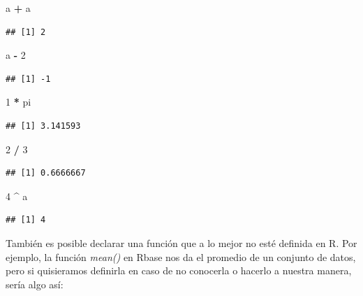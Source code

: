 \documentclass[
]{book}
\newenvironment{Shaded}{\begin{snugshade}}{\end{snugshade}}
\newcommand{\DecValTok}[1]{\textcolor[rgb]{0.00,0.00,0.81}{#1}}
\newcommand{\NormalTok}[1]{#1}
\newcommand{\SpecialCharTok}[1]{\textcolor[rgb]{0.81,0.36,0.00}{\textbf{#1}}}
\begin{document}
\begin{Shaded}
\begin{Highlighting}[]
\NormalTok{a }\SpecialCharTok{+}\NormalTok{ a}
\end{Highlighting}
\end{Shaded}

\begin{verbatim}
## [1] 2
\end{verbatim}

\begin{Shaded}
\begin{Highlighting}[]
\NormalTok{a }\SpecialCharTok{{-}} \DecValTok{2}
\end{Highlighting}
\end{Shaded}

\begin{verbatim}
## [1] -1
\end{verbatim}

\begin{Shaded}
\begin{Highlighting}[]
\DecValTok{1} \SpecialCharTok{*}\NormalTok{ pi}
\end{Highlighting}
\end{Shaded}

\begin{verbatim}
## [1] 3.141593
\end{verbatim}

\begin{Shaded}
\begin{Highlighting}[]
\DecValTok{2} \SpecialCharTok{/} \DecValTok{3}
\end{Highlighting}
\end{Shaded}

\begin{verbatim}
## [1] 0.6666667
\end{verbatim}

\begin{Shaded}
\begin{Highlighting}[]
\DecValTok{4} \SpecialCharTok{\^{}}\NormalTok{ a}
\end{Highlighting}
\end{Shaded}

\begin{verbatim}
## [1] 4
\end{verbatim}

También es posible declarar una función que a lo mejor no esté definida en R.
Por ejemplo, la función \emph{mean()} en Rbase nos da el promedio de un conjunto de datos, pero si quisieramos definirla en caso de no conocerla o hacerlo a nuestra manera, sería algo así:
\end{document}
